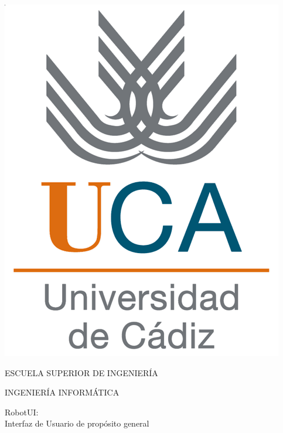 


\pagestyle{empty}
\begin{center}

  \includegraphics[scale=0.2]{0_inicio/logo_uca.png} \\

  \vspace{2.0cm}

  \Large{ESCUELA SUPERIOR DE INGENIERÍA} \\

  \vspace{1.0cm}

  \large{INGENIERÍA INFORMÁTICA} \\

  \vspace{2.0cm}

  \large{RobotUI: \\Interfaz de Usuario de propósito general} \\

  \vspace{1.0cm}

\end{center}

